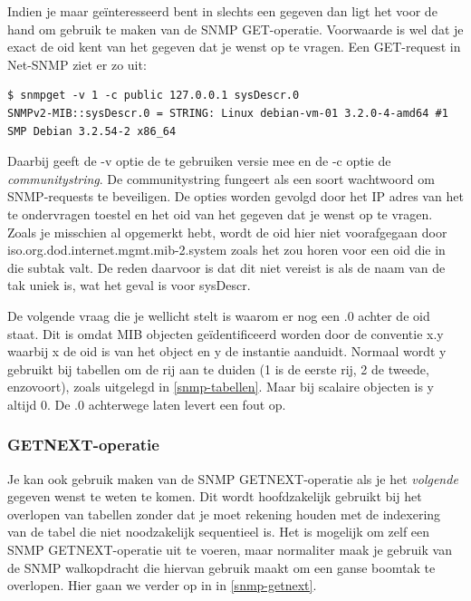 Indien je maar geïnteresseerd bent in slechts een gegeven dan ligt het voor de hand om gebruik te maken van de SNMP GET-operatie.
Voorwaarde is wel dat je exact de \gls{oid} kent van het gegeven dat je wenst op te vragen.
Een GET-request in Net-SNMP ziet er zo uit:

\begin{lstlisting}[float=h, caption={SNMP GET-opdracht}, label=netsnmp-get]
$ snmpget -v 1 -c public 127.0.0.1 sysDescr.0
SNMPv2-MIB::sysDescr.0 = STRING: Linux debian-vm-01 3.2.0-4-amd64 #1 SMP Debian 3.2.54-2 x86_64
\end{lstlisting}

Daarbij geeft de -v optie de te gebruiken versie mee en de -c optie de \textit{communitystring}.
De communitystring fungeert als een soort wachtwoord om SNMP-requests te beveiligen.
De opties worden gevolgd door het IP adres van het te ondervragen toestel en het \gls{oid} van het gegeven dat je wenst op te vragen.
Zoals je misschien al opgemerkt hebt, wordt de \gls{oid} hier niet voorafgegaan door iso.org.dod.internet.mgmt.mib-2.system zoals het zou horen
voor een \gls{oid} die in die subtak valt. De reden daarvoor is dat dit niet vereist is als de naam van de tak uniek is, wat het geval is voor sysDescr.

De volgende vraag die je wellicht stelt is waarom er nog een .0 achter de \gls{oid} staat.
Dit is omdat MIB objecten geïdentificeerd worden door de conventie x.y waarbij x de \gls{oid} is van het object
en y de instantie aanduidt. Normaal wordt y gebruikt bij tabellen om de rij aan te duiden (1 is de eerste rij, 2 de tweede, enzovoort),
zoals uitgelegd in \cref{snmp-tabellen}.
Maar bij scalaire objecten is y altijd 0. De .0 achterwege laten levert een fout op.\cite{essentialsnmp}

\subsubsection{GETNEXT-operatie}

Je kan ook gebruik maken van de SNMP GETNEXT-operatie als je het \emph{volgende} gegeven wenst te weten te komen.
Dit wordt hoofdzakelijk gebruikt bij het overlopen van tabellen zonder dat je moet rekening houden met de indexering van de tabel
die niet noodzakelijk sequentieel is.
Het is mogelijk om zelf een SNMP GETNEXT-operatie uit te voeren, maar normaliter maak je gebruik van de SNMP walkopdracht die
hiervan gebruik maakt om een ganse boomtak te overlopen. Hier gaan we verder op in in \cref{snmp-getnext}.

